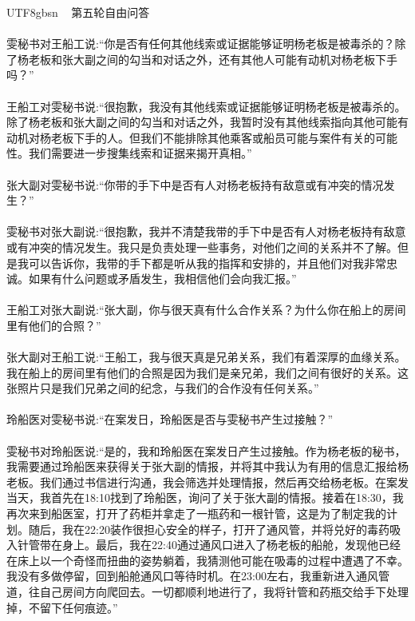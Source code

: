 \documentclass[11pt]{article}
\begin{document}
{\begin{CJK}{UTF8}{gbsn}
\ \raisedrule[.5ex]{1pt} 第五轮自由问答 \raisedrule[.5ex]{1pt} \ \\\\
雯秘书对王船工说:``你是否有任何其他线索或证据能够证明杨老板是被毒杀的？除了杨老板和张大副之间的勾当和对话之外，还有其他人可能有动机对杨老板下手吗？''\\ \\
王船工对雯秘书说:``很抱歉，我没有其他线索或证据能够证明杨老板是被毒杀的。除了杨老板和张大副之间的勾当和对话之外，我暂时没有其他线索指向其他可能有动机对杨老板下手的人。但我们不能排除其他乘客或船员可能与案件有关的可能性。我们需要进一步搜集线索和证据来揭开真相。''\\ \\
张大副对雯秘书说:``你带的手下中是否有人对杨老板持有敌意或有冲突的情况发生？''\\ \\
雯秘书对张大副说:``很抱歉，我并不清楚我带的手下中是否有人对杨老板持有敌意或有冲突的情况发生。我只是负责处理一些事务，对他们之间的关系并不了解。但是我可以告诉你，我带的手下都是听从我的指挥和安排的，并且他们对我非常忠诚。如果有什么问题或矛盾发生，我相信他们会向我汇报。''\\ \\
王船工对张大副说:``张大副，你与很天真有什么合作关系？为什么你在船上的房间里有他们的合照？''\\ \\
张大副对王船工说:``王船工，我与很天真是兄弟关系，我们有着深厚的血缘关系。我在船上的房间里有他们的合照是因为我们是亲兄弟，我们之间有很好的关系。这张照片只是我们兄弟之间的纪念，与我们的合作没有任何关系。''\\ \\
玲船医对雯秘书说:``在案发日，玲船医是否与雯秘书产生过接触？''\\ \\
雯秘书对玲船医说:``是的，我和玲船医在案发日产生过接触。作为杨老板的秘书，我需要通过玲船医来获得关于张大副的情报，并将其中我认为有用的信息汇报给杨老板。我们通过书信进行沟通，我会筛选并处理情报，然后再交给杨老板。在案发当天，我首先在18:10找到了玲船医，询问了关于张大副的情报。接着在18:30，我再次来到船医室，打开了药柜并拿走了一瓶药和一根针管，这是为了制定我的计划。随后，我在22:20装作很担心安全的样子，打开了通风管，并将兑好的毒药吸入针管带在身上。最后，我在22:40通过通风口进入了杨老板的船舱，发现他已经在床上以一个奇怪而扭曲的姿势躺着，我猜测他可能在吸毒的过程中遭遇了不幸。我没有多做停留，回到船舱通风口等待时机。在23:00左右，我重新进入通风管道，往自己房间方向爬回去。一切都顺利地进行了，我将针管和药瓶交给手下处理掉，不留下任何痕迹。''\\ \\


\end{CJK}}
\end{document}
